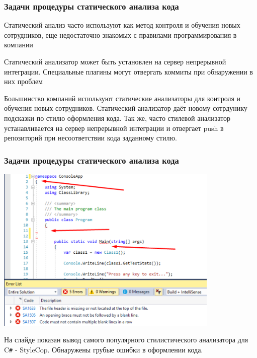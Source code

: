 \documentclass{../industrial-development}
\begin{document}
\begin{frame} \frametitle{Задачи процедуры статического анализа кода}
	\begin{block}{}
		Статический анализ часто используют как метод контроля и обучения новых сотрудников, еще недостаточно знакомых с правилами программирования в компании
	\end{block}
	\begin{block}{}
		Статический анализатор может быть установлен на сервер непрерывной интеграции. Специальные плагины могут отвергать коммиты при обнаружении в них проблем
	\end{block}
\end{frame}
\lecturenotes
Большинство компаний используют статические анализаторы для контроля и обучения новых сотрудников. Статический анализатор даёт новому сотрдунику подсказки по стилю оформления кода. Так же, часто стилевой анализатор устанавливается на сервер непрерывной интеграции и отвергает push в репозиторий при несоответствии кода заданному стилю.

\begin{frame} \frametitle{Задачи процедуры статического анализа кода}
	\centerline{\includegraphics[width=0.8\textwidth]{stylecop.pdf}}
\end{frame}
\lecturenotes
На слайде показан вывод самого популярного стилистического анализатора для C\texttt{\#} - StyleCop. Обнаружены грубые ошибки в оформлении кода.
\end{document}
